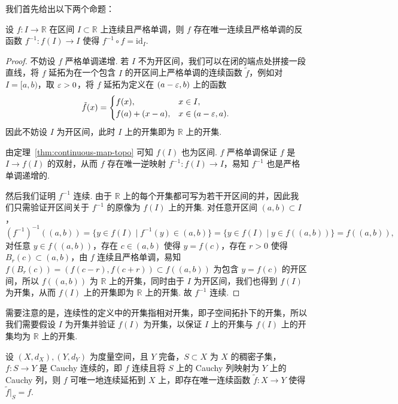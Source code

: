 \documentclass[../main.tex]{subfiles}
\begin{document}
我们首先给出以下两个命题：

\begin{proposition} \label{prop:monotone-inverse-continuous-func}
    设 $f:I \to \mathbb R$ 在区间 $I \subset \mathbb R$ 上连续且严格单调，则 $f$ 存在唯一连续且严格单调的反函数 $f^{-1}:f(I) \to I$ 使得 $f^{-1} \circ f = \mathrm{id}_I$. 
\end{proposition}

\begin{proof}
    不妨设 $f$ 严格单调递增. 若 $I$ 不为开区间，我们可以在闭的端点处拼接一段直线，将 $f$ 延拓为在一个包含 $I$ 的开区间上严格单调的连续函数 $\tilde{f}$，例如对 $I = [a, b)$，取 $\varepsilon > 0$，将 $f$ 延拓为定义在 $(a - \varepsilon, b)$ 上的函数
    $$
    \tilde{f}(x) = \begin{cases}
        f(x), & x \in I,  \\
        f(a) + (x - a), & x \in (a - \varepsilon, a). 
    \end{cases}
    $$
    因此不妨设 $I$ 为开区间，此时 $I$ 上的开集即为 $\mathbb R$ 上的开集. 
    
    由定理~\ref{thm:continuous-map-topo} 可知 $f(I)$ 也为区间. $f$ 严格单调保证 $f$ 是 $I \to f(I)$ 的双射，从而 $f$ 存在唯一逆映射 $f^{-1}:f(I) \to I$，易知 $f^{-1}$ 也是严格单调递增的. 
    
    然后我们证明 $f^{-1}$ 连续. 由于 $\mathbb R$ 上的每个开集都可写为若干开区间的并，因此我们只需验证开区间关于 $f^{-1}$ 的原像为 $f(I)$ 上的开集. 对任意开区间 $(a, b) \subset I$，
    $$
    (f^{-1})^{-1}((a, b)) = \{y \in f(I) \mid f^{-1}(y) \in (a, b)\} = \{y \in f(I) \mid y \in f((a, b))\} = f((a, b)), 
    $$
    对任意 $y \in f((a, b))$，存在 $c \in (a, b)$ 使得 $y = f(c)$，存在 $r > 0$ 使得 $B_r(c) \subset (a, b)$，由 $f$ 连续且严格单调，易知 $f(B_r(c)) = (f(c - r), f(c + r)) \subset f((a, b))$ 为包含 $y = f(c)$ 的开区间，所以 $f((a, b))$ 为 $\mathbb R$ 上的开集，同时由于 $I$ 为开区间，我们也得到 $f(I)$ 为开集，从而 $f(I)$ 上的开集即为 $\mathbb R$ 上的开集. 故 $f^{-1}$ 连续. 
\end{proof}

\begin{remark}
    需要注意的是，连续性的定义中的开集指相对开集，即子空间拓扑下的开集，所以我们需要假设 $I$ 为开集并验证 $f(I)$ 为开集，以保证 $I$ 上的开集与 $f(I)$ 上的开集均为 $\mathbb R$ 上的开集. 
\end{remark}

\begin{theorem} \label{thm:Cauchy-continuous-extension}
    设 $(X, d_X), (Y, d_Y)$ 为度量空间，且 $Y$ 完备，$S \subset X$ 为 $X$ 的稠密子集，$f:S \to Y$ 是 Cauchy 连续的，即 $f$ 连续且将 $S$ 上的 Cauchy 列映射为 $Y$ 上的 Cauchy 列，则 $f$ 可唯一地连续延拓到 $X$ 上，即存在唯一连续函数 $\tilde{f}:X \to Y$ 使得 $\tilde{f}|_S = f$. 
\end{theorem}
\end{document}
